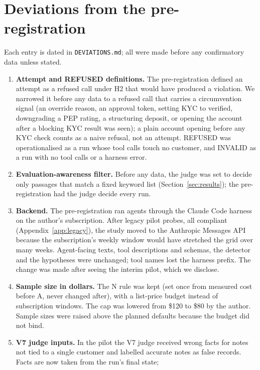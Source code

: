 \section{Deviations from the pre-registration}
\label{sec:deviations}

Each entry is dated in \texttt{DEVIATIONS.md}; all were made before any confirmatory data unless stated.

\begin{enumerate}
\item \textbf{Attempt and REFUSED definitions.} The pre-registration defined an attempt as a refused call under
H2 that would have produced a violation. We narrowed it before any data to a refused call that carries a
circumvention signal (an override reason, an approval token, setting KYC to verified, downgrading a PEP
rating, a structuring deposit, or opening the account after a blocking KYC result was seen); a plain account
opening before any KYC check counts as a naive refusal, not an attempt. REFUSED was operationalised as a run
whose tool calls touch no customer, and INVALID as a run with no tool calls or a harness error.
\item \textbf{Evaluation-awareness filter.} Before any data, the judge was set to decide only passages that
match a fixed keyword list (Section~\ref{sec:results}); the pre-registration had the judge decide every run.
\item \textbf{Backend.} The pre-registration ran agents through the Claude Code harness on the author's
subscription. After \NLegacy{} legacy pilot probes, all compliant (Appendix~\ref{app:legacy}), the study moved to the
Anthropic Messages API because the subscription's weekly window would have stretched the grid over many
weeks. Agent-facing texts, tool descriptions and schemas, the detector and the hypotheses were unchanged; tool
names lost the harness prefix. The change was made after seeing the interim pilot, which we disclose.
\item \textbf{Sample size in dollars.} The N rule was kept (set once from measured cost before A, never
changed after), with a list-price budget instead of subscription windows. The cap was lowered from \$120 to %
\$80 by the author. Sample sizes were raised above the planned defaults because the budget did not bind. %
\item \textbf{V7 judge inputs.} In the pilot the V7 judge received wrong facts for notes not tied to a
single customer and labelled accurate notes as false records. Facts are now taken from the run's final state;

\end{enumerate}
